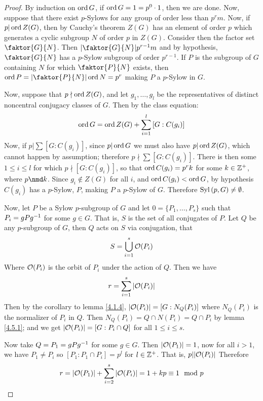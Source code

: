 \begin{proof}
  By induction on $\operatorname{ord}{G}$, if $\operatorname{ord}{G}=1=p^0 \cdot 1$, then we are done.
  Now, suppose that there exist $p$-Sylows for any group of order less than
  $p^rm$. Now, if $p|\operatorname{ord}{Z(G)}$, then by Cauchy's theorem $Z(G)$ has an element
  of order $p$ which generates a cyclic subgroup $N$ of order $p$ in $Z(G)$.
  Consider then the factor set $\faktor{G}{N}$. Then $|\faktor{G}{N}|p^{r-1}m$
  and by hypothesis, $\faktor{G}{N}$ has a $p$-Sylow subgroup of order
  $p^{r-1}$. If $P$ is the subgroup of $G$ containing $N$ for which
  $\faktor{P}{N}$ exists, then $\ord{P}=|\faktor{P}{N}|\ord{N}=p^r$ making $P$
  a $p$-Sylow in $G$.

  Now, suppose that  $p \nmid \operatorname{ord}{Z(G)}$, and let $g_1, \dots, g_l$ be the
  representatives of distinct noncentral conjugacy classes of $G$. Then by the
  class equation:
  \begin{equation*}
    \operatorname{ord}{G}=\operatorname{ord}{Z(G)}+\sum_{i=1}^l{[G:C(g_i)]}
  \end{equation*}
  Now, if $p|\sum{[G:C(g_i)]}$, since $p|\operatorname{ord}{G}$ we must also have
  $p|\operatorname{ord}{Z(G)}$, which cannot happen by assumption; therefore $p \nmid
  \sum{[G:C(g_i)]}$. There is then some $1 \leq i \leq l$ for which  $p \nmid
  [G:C(g_i)]$, so that $\operatorname{ord}{C(g_i)}=p^rk$ for some $k \in \mathbb{Z}^+$, where  $p
  \nmd k$. Since  $g_i \notin Z(G)$ for all $i$, and $\operatorname{ord}{C(g_i)}<\operatorname{ord}{G}$,
  by hypothesis $C(g_i)$ has a $p$-Sylow, $P$, making  $P$ a $p$-Sylow of $G$.
  Therefore $\operatorname{Syl}{(p,G)} \neq \emptyset$.

  Now, let $P$ be a Sylow $p$-subgroup of $G$ and let  $0=\{P_1, \dots, P_s\}$
  such that $P_i=gPg^{-1}$ for some $g \in G$. That is,  $S$ is the set of
  all conjugates of  $P$. Let $Q$ be any $p$-subgroup of $G$, then $Q$ acts on
  $S$ via conjugation, that
  \begin{equation*}
    S=\bigcup_{i=1}^s{\mathcal{O}(P_i)}
  \end{equation*}
  Where $\mathcal{O}(P_i)$ is the orbit of $P_i$ under the action of  $Q$. Then we
  have
  \begin{equation*}
    r=\sum_{i=1}^s{|\mathcal{O}(P_i)|}
  \end{equation*}
  Then by the corollary to lemma \ref{4.1.4}, $|\mathcal{O}(P_i)|=[G:N_Q(P_i)]$ where
  $N_Q(P_i)$ is the normalizer of $P_i$ in $Q$. Then $N_Q(P_i)=Q \cap N(P_i)=Q
  \cap P_i$ by lemma \ref{4.5.1}; and we get $|\mathcal{O}(P_i)|=[G:P_i \cap Q]$ for
  all $1 \leq i \leq s$.

  Now take $Q=P_1=gPg^{-1}$ for some $g \in G$. Then  $|\mathcal{O}(P_1)|=1$, now
  for all $i>1$, we have $P_1 \neq P_i$ so $[P_1:P_1 \cap P_i]=p^l$ for $l
  \in \mathbb{Z}^+$. That is,  $p||\mathcal{O}(P_i)|$ Therefore
  \begin{equation*}
    r=|\mathcal{O}(P_1)|+\sum_{i=2}^s{|\mathcal{O}(P_i)|}=1+kp \equiv 1 \mod{p}
  \end{equation*}


\end{proof}
